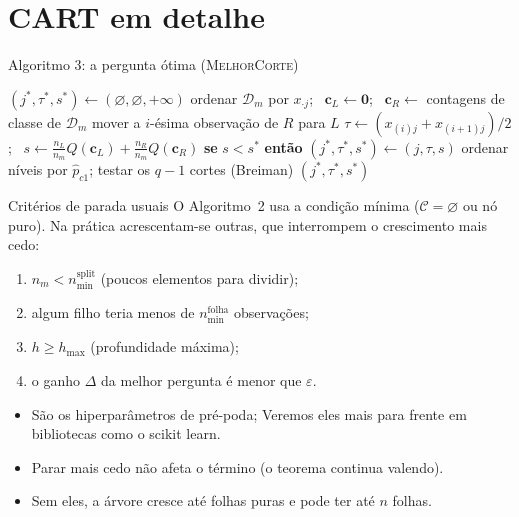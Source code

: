 \documentclass[aspectratio=169]{beamer}
\newcommand{\Q}{Q}
\newcommand{\Cand}{\mathcal C}            %
\newcommand{\aGrow}{2}
\newcommand{\aBest}{3}
\begin{document}
\section{CART em detalhe}\label{sec:cartdet}

\begin{frame}[t]{Algoritmo \aBest: a pergunta ótima (\textsc{MelhorCorte})}
\footnotesize
\begin{algorithmic}[1]
  \State $(j^*,\tau^*,s^*)\gets(\varnothing,\varnothing,+\infty)$
      \State ordenar $\mathcal D_m$ por $x_{\cdot j}$; \ $\mathbf c_L\gets\mathbf 0$; \ $\mathbf c_R\gets$ contagens de classe de $\mathcal D_m$
        \State mover a $i$-ésima observação de $R$ para $L$ 
          \State $\tau\gets(x_{(i)j}+x_{(i+1)j})/2$; \ $s\gets\frac{n_L}{n_m}\Q(\mathbf c_L)+\frac{n_R}{n_m}\Q(\mathbf c_R)$
          \State \textbf{se} $s<s^*$ \textbf{então} $(j^*,\tau^*,s^*)\gets(j,\tau,s)$
        \EndIf
      \EndFor
    \Else {}
      \State ordenar níveis por $\hat p_{c1}$; testar os $q-1$ cortes (Breiman)
    \EndIf
  \EndFor
  \State \Return $(j^*,\tau^*,s^*)$
\EndFunction
\end{algorithmic}
\end{frame}

\begin{frame}{Critérios de parada usuais}
O Algoritmo~\aGrow{} usa a condição \alert{mínima} ($\Cand=\varnothing$ ou nó puro). Na prática acrescentam-se outras, que interrompem o crescimento mais cedo:
\begin{enumerate}
  \item $n_m<n_{\min}^{\text{split}}$ (poucos elementos para dividir);
  \item algum filho teria menos de $n_{\min}^{\text{folha}}$ observações;
  \item $h\ge h_{\max}$ (profundidade máxima);
  \item o ganho $\Delta$ da melhor pergunta é menor que $\varepsilon$.
\end{enumerate}
\vspace{6pt}
\begin{itemize}
  \item São os \alert{hiperparâmetros de pré-poda}; Veremos eles mais para frente em bibliotecas como o scikit learn.
  \item Parar mais cedo não afeta o término (o teorema continua valendo).
  \item Sem eles, a árvore cresce até folhas puras e pode ter até $n$ folhas.
\end{itemize}
\end{frame}
\end{document}
